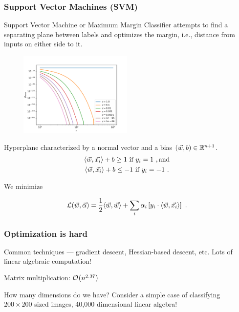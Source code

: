 \begin{frame}
    \frametitle{Support Vector Machines (SVM)}

    Support Vector Machine or Maximum Margin Classifier attempts to find a
    separating plane between labels and optimizes the margin, i.e., distance
    from inputs on either side to it.

    \begin{multicols}{2}
        \begin{figure}
            \includegraphics[width=0.5\textwidth]{figures/perrorplot.pdf}
        \end{figure}
        Hyperplane characterized by a normal vector and a bias \((\vec{w}, b) \in
        \mathbb{R}^{n+1}\).
        \begin{gather*}
            \langle \vec{w}, \vec{x_i}\rangle + b \geq 1 \text{ if } y_i = 1~, \text{and}\\
            \langle \vec{w}, \vec{x_i}\rangle + b \leq -1 \text{ if } y_i = -1~.
        \end{gather*}

        We minimize

        \begin{equation*}
            \mathcal{L}(\vec{w}, \vec{\alpha}) = \frac{1}{2} \langle \vec{w}, \vec{w}\rangle + \sum_i \alpha_i \left[y_i \cdot \langle \vec{w}, \vec{x_i}\rangle\right]~.
        \end{equation*}
    \end{multicols}

\end{frame}

\begin{frame}
    \frametitle{Optimization is hard}

    Common techniques --- gradient descent, Hessian-based descent, etc.
    Lots of linear algebraic computation! 

    Matrix multiplication: \(\order{n^{2.37}}\)

    How many dimensions do we have? Consider a simple case of classifying
    \(200\times 200\) sized images, 40,000 dimensional linear algebra!

\end{frame}

